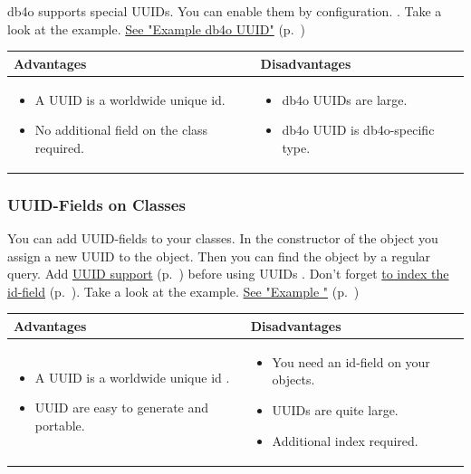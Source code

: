 db4o supports special UUIDs. You can enable them by configuration. . Take a look at the example. \hyperref[ref:platform-specific-issues-disconnected-objects-example-db4o-uuid]{See "Example db4o UUID"} (p.~\pageref{ref:platform-specific-issues-disconnected-objects-example-db4o-uuid})

{\small
\begin{longtable}{|p{}|p{}|}
\hline
\textbf{Advantages} & \textbf{Disadvantages} \\ \hline
\begin{itemize}
\item A UUID is a worldwide unique id.
\item No additional field on the class required.
\end{itemize} & \begin{itemize}
\item db4o UUIDs are large.
\item db4o UUID is db4o-specific type.
\end{itemize} \\ \hline
\end{longtable}}

\subsubsection*{UUID-Fields on Classes}

You can add UUID-fields to your classes. In the constructor of the object you assign a new UUID to the object. Then you can find the object by a regular query. Add \hyperref[ref:advanced-topics-type-handling-uuid-support]{UUID support} (p.~\pageref{ref:advanced-topics-type-handling-uuid-support}) before using UUIDs . Don't forget \hyperref[ref:basics-indexing]{to index the id-field} (p.~\pageref{ref:basics-indexing}). Take a look at the example. \hyperref[ref:platform-specific-issues-disconnected-objects-example-plattform-uuid]{See "Example "} (p.~\pageref{ref:platform-specific-issues-disconnected-objects-example-plattform-uuid})

{\small
\begin{longtable}{|p{}|p{}|}
\hline
\textbf{Advantages} & \textbf{Disadvantages} \\ \hline
\begin{itemize}
\item A UUID is a worldwide unique id .
\item UUID are easy to generate and portable.
\end{itemize} & \begin{itemize}
\item You need an id-field on your objects.
\item UUIDs are quite large.
\item Additional index required.
\end{itemize} \\ \hline
\end{longtable}}

